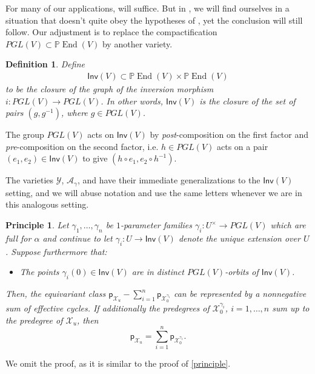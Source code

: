 \documentclass[12 pt, reqno]{amsart}
\newtheorem{defn}[thm]{Definition}
\newtheorem{prin}[thm]{Principle}
\theoremstyle{definition}
\newcommand{\on}{\operatorname}
\newcommand{\mb}{\mathbb}
\renewcommand{\P}{\mb{P}}
\newcommand{\p}{\mathsf{p}}
\begin{document}
For many of our applications,  will suffice. But in
, we will find ourselves in a situation that
doesn't quite obey the hypotheses of , yet the
conclusion will still follow. Our adjustment is to replace the
compactification $PGL(V) \subset \P \on{End}(V)$ by another variety.
\begin{defn}
\label{def:Inv}
Define
\begin{align*}
  \label{Inv}
  \mathsf{Inv}(V) \subset \P \on{End}(V) \times \P \on{End}(V)
\end{align*}  to be 
the closure of the graph of the inversion morphism
$i: PGL(V) \to PGL(V)$.  In other words, $\mathsf{Inv}(V)$ is the
closure of the set of pairs $(g,g^{-1})$, where $g \in PGL(V)$.
\end{defn}

The group $PGL(V)$ acts on $\mathsf{Inv}(V)$ by {\sl post}-composition
on the first factor and {\sl pre}-composition on the second factor,
i.e. $h \in PGL(V)$ acts on a pair $(e_1, e_2) \in \mathsf{Inv}(V)$ to
give $(h \circ e_{1}, e_{2} \circ h^{-1})$.

The varieties $\mathcal{Y}$, $\mathcal{A}_{\gamma}$, and
 have their immediate generalizations to the
$\mathsf{Inv}(V)$ setting, and we will abuse notation and use the same
letters whenever we are in this analogous setting.



\begin{prin}
\label{principle2}
Let $\gamma_1,\ldots,\gamma_n$ be $1$-parameter families
$\gamma_i: U^{\times}\to PGL(V)$ which are full for $\alpha$ and
continue to let $\gamma_{i}: U \to \mathsf{Inv}(V)$ denote the unique
extension over $U$.  Suppose furthermore that:
\begin{itemize}
\item The points $\gamma_i(0) \in \mathsf{Inv}(V)$ are in distinct
  $PGL(V)$-orbits of $\mathsf{Inv}(V)$.
\end{itemize}
Then, the equivariant class
$\p_{\mathcal{X}_{u}}-\sum_{i=1}^{n}\p_{\mathcal{X}^{\gamma_{i}}_{0}}$
can be represented by a nonnegative sum of effective cycles. If
additionally the predegrees of $\mathcal{X}^{\gamma_{i}}_{0}$,
$i=1, \ldots, n$ sum up to the predegree of $\mathcal{X}_{u}$, then
\[\p_{\mathcal{X}_{u}}=\sum_{i=1}^{n}\p_{\mathcal{X}^{\gamma_{i}}_{0}}.\]
\end{prin}

We omit the proof, as it is similar to the proof of \cref{principle}.
\end{document}
